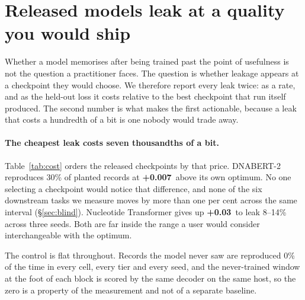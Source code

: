 \section{Released models leak at a quality you would ship}
\label{sec:leak}

Whether a model memorises after being trained past the point of usefulness is not the question a
practitioner faces. The question is whether leakage appears at a checkpoint they would choose. We
therefore report every leak twice: as a rate, and as the held-out loss it costs relative to the
best checkpoint that run itself produced. The second number is what makes the first actionable,
because a leak that costs a hundredth of a bit is one nobody would trade away.

\paragraph{The cheapest leak costs seven thousandths of a bit.}
Table~\ref{tab:cost} orders the released checkpoints by that price. DNABERT-2 reproduces 30\% of
planted records at \textbf{+0.007\,\bits} above its own optimum. No one selecting a checkpoint
would notice that difference, and none of the six downstream tasks we measure moves by more than one per
cent across the same interval (\S\ref{sec:blind}). Nucleotide Transformer gives up
\textbf{+0.03\,\bits} to leak 8--14\% across three seeds. Both are far inside the range a user
would consider interchangeable with the optimum.

The control is flat throughout. Records the model never saw are reproduced 0\% of the time in every
cell, every tier and every seed, and the never-trained window at the foot of each block is scored by
the same decoder on the same host, so the zero is a property of the measurement and not of a
separate baseline.

